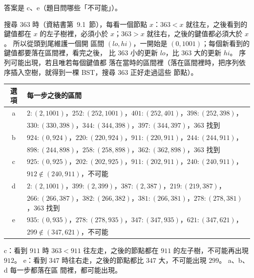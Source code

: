 \begin{pastsoln}
答案是 c、e（題目問哪些「不可能」）。

搜尋 $363$ 時（資結書第~9.1~節），每看一個節點 $x$：$363 < x$ 就往左，之後看到的鍵值都在 $x$
的左子樹裡，必須小於 $x$；$363 > x$ 就往右，之後的鍵值都必須大於 $x$。 所以從頭到尾維護一個開
區間 $(\mathit{lo}, \mathit{hi})$，一開始是 $(0, 1001)$；每個新看到的鍵值都要落在區間裡，看完之後，
比 $363$ 小的更新 $\mathit{lo}$，比 $363$ 大的更新 $\mathit{hi}$。 序列可能出現，若且唯若每個鍵值都
落在當時的區間裡（落在區間裡時，把序列依序插入空樹，就得到一棵 BST，搜尋 $363$ 正好走過這些
節點）。

\begin{center}
\small
\begin{tabular}{cl}
\toprule
選項 & 每一步之後的區間 \\
\midrule
a & $2{:}(2, 1001)$，$252{:}(252, 1001)$，$401{:}(252, 401)$，$398{:}(252, 398)$，\\
  & $330{:}(330, 398)$，$344{:}(344, 398)$，$397{:}(344, 397)$，$363$ 找到 \\
b & $924{:}(0, 924)$，$220{:}(220, 924)$，$911{:}(220, 911)$，$244{:}(244, 911)$，\\
  & $898{:}(244, 898)$，$258{:}(258, 898)$，$362{:}(362, 898)$，$363$ 找到 \\
c & $925{:}(0, 925)$，$202{:}(202, 925)$，$911{:}(202, 911)$，$240{:}(240, 911)$，\\
  & $912 \notin (240, 911)$，不可能 \\
d & $2{:}(2, 1001)$，$399{:}(2, 399)$，$387{:}(2, 387)$，$219{:}(219, 387)$，\\
  & $266{:}(266, 387)$，$382{:}(266, 382)$，$381{:}(266, 381)$，$278{:}(278, 381)$，$363$ 找到 \\
e & $935{:}(0, 935)$，$278{:}(278, 935)$，$347{:}(347, 935)$，$621{:}(347, 621)$，\\
  & $299 \notin (347, 621)$，不可能 \\
\bottomrule
\end{tabular}
\end{center}

c：看到 $911$ 時 $363 < 911$ 往左走，之後的節點都在 $911$ 的左子樹，不可能再出現 $912$。
e：看到 $347$ 時往右走，之後的節點都比 $347$ 大，不可能出現 $299$。 a、b、d 每一步都落在區
間裡，都可能出現。
\end{pastsoln}
